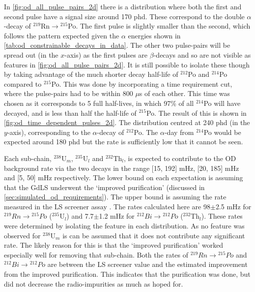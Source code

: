 

\par
In \autoref{fig:od_all_pulse_pairs_2d} there is a distribution where both the first and second pulse have a signal size around 170 phd.
These correspond to the double $\alpha$-decay of ${}^{219}$Rn$\to{}^{215}$Po.
The first pulse is slightly smaller than the second, which follows the pattern expected given the $\alpha$ energies shown in \autoref{tab:od_constrainable_decays_in_data}.
The other two pulse-pairs will be spread out (in the $x$-axis) as the first pulses are $\beta$-decays and so are not visible as features in \autoref{fig:od_all_pulse_pairs_2d}.
It is still possible to isolate these though by taking advantage of the much shorter decay half-life of ${}^{212}$Po and ${}^{214}$Po compared to ${}^{215}$Po.
This was done by incorporating a time requirement cut, where the pulse-pairs had to be within 800 $\mu$s of each other.
This time was chosen as it corresponds to 5 full half-lives, in which 97\% of all ${}^{214}$Po will have decayed, and is less than half the half-life of ${}^{215}$Po.
The result of this is shown in \autoref{fig:od_time_dependent_pulses_2d}.
The distribution centred at 240 phd (in the $y$-axis), corresponding to the $\alpha$-decay of ${}^{212}$Po.
The $\alpha$-day from ${}^{214}$Po would be expected around 180 phd but the rate is sufficiently low that it cannot be seen.

\par
Each sub-chain, ${}^{238}$U$_{m}$, ${}^{235}$U$_{l}$ and ${}^{232}$Th$_{l}$, is expected to contribute to the OD background rate via the two decays in the range [15, 192] mHz, [20, 185] mHz and [5, 50] mHz respectively.
The lower bound on each expectation is assuming that the GdLS underwent the `improved purification' (discussed in \autoref{sec:simulated_od_requirements}).
The upper bound is assuming the rate measured in the LS screener assay \cite{scotthaselschwardt_thesis_ref}.
The rates calculated here are 98$\pm$2.5 mHz for ${}^{219}Rn \to {}^{215}Po$ (${}^{235}$U$_{l}$) and 7.7$\pm$1.2 mHz for ${}^{212}Bi \to {}^{212}Po$ (${}^{232}$Th$_{l}$).
These rates were determined by isolating the feature in each distribution.
As no feature was observed for ${}^{238}$U$_{m}$ is can be assumed that it does not contribute any significant rate.
The likely reason for this is that the `improved purification' worked especially well for removing that sub-chain.
Both the rates of ${}^{219}Rn \to {}^{215}Po$ and ${}^{212}Bi \to {}^{212}Po$ are between the LS screener value and the estimated improvement from the improved purification.
This indicates that the purification was done, but did not decrease the radio-impurities as much as hoped for.

